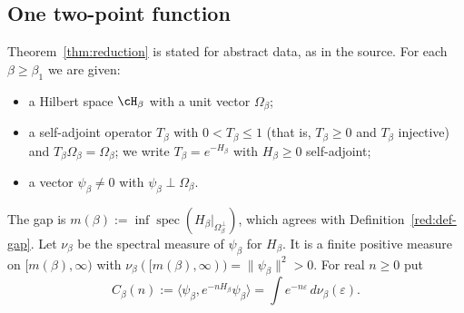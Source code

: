 \subsection{One two-point function}\label{red:R}

Theorem~\ref{thm:reduction} is stated for abstract data, as in the source. For each $\beta\ge\beta_1$ we are given:
\begin{itemize}
\item a Hilbert space $\cH_\beta$ with a unit vector $\Omega_\beta$;
\item a self-adjoint operator $T_\beta$ with $0<T_\beta\le1$ (that is, $T_\beta\ge0$ and $T_\beta$ injective) and $T_\beta\Omega_\beta=\Omega_\beta$; we write $T_\beta=e^{-H_\beta}$ with $H_\beta\ge0$ self-adjoint;
\item a vector $\psi_\beta\ne0$ with $\psi_\beta\perp\Omega_\beta$.
\end{itemize}
The gap is $m(\beta):=\inf\operatorname{spec}(H_\beta|_{\Omega_\beta^\perp})$, which agrees with Definition~\ref{red:def-gap}. Let $\nu_\beta$ be the spectral measure of $\psi_\beta$ for $H_\beta$. It is a finite positive measure on $[m(\beta),\infty)$ with $\nu_\beta([m(\beta),\infty))=\|\psi_\beta\|^2>0$. For real $n\ge0$ put
\begin{equation}\label{red:C}
  C_\beta(n):=\langle\psi_\beta,e^{-nH_\beta}\psi_\beta\rangle=\int e^{-n\varepsilon}\,d\nu_\beta(\varepsilon).
\end{equation}
